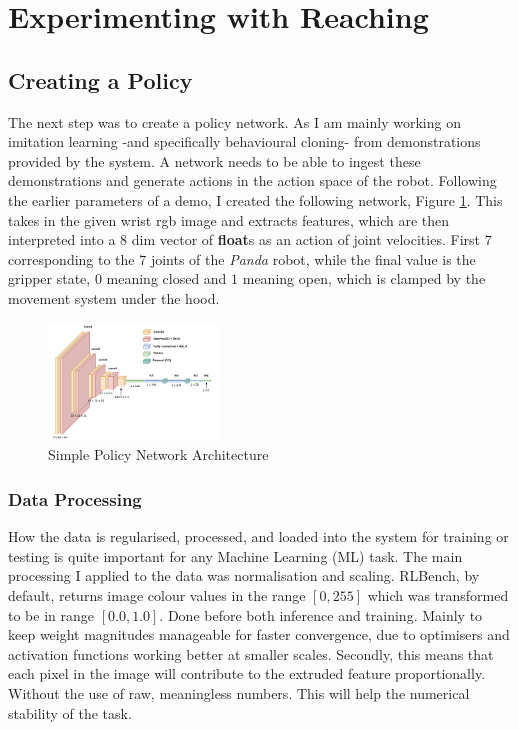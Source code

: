 \section{Experimenting with Reaching}\label{sec:reach-no-obs}

\subsection{Creating a Policy}
The next step was to create a policy network. As I am mainly working on imitation learning -and specifically behavioural cloning- from demonstrations provided by the system. A network needs to be able to ingest these demonstrations and generate actions in the action space of the robot. Following the earlier parameters of a demo, I created the following network, Figure \ref{fig:policy-arch}. This takes in the given wrist rgb image and extracts features, which are then interpreted into a $8$ dim vector of \textbf{float}s as an action of joint velocities. First $7$ corresponding to the $7$ joints of the \emph{Panda} robot, while the final value is the gripper state, $0$ meaning closed and $1$ meaning open, which is clamped by the movement system under the hood.

\begin{figure}[h]
  \centering
  \includegraphics[width=0.4\textwidth]{assets/early-work/cnn-encoder-policy-head.png}
  \caption{Simple Policy Network Architecture}\label{fig:policy-arch}
\end{figure}


\subsubsection{Data Processing}
How the data is regularised, processed, and loaded into the system for training or testing is quite important for any Machine Learning (ML) task. The main processing I applied to the data was normalisation and scaling. RLBench, by default, returns image colour values in the range \(\left[0, 255\right]\) which was transformed to be in range \(\left[0.0, 1.0\right]\). Done before both inference and training. Mainly to keep weight magnitudes manageable for faster convergence, due to optimisers and activation functions working better at smaller scales. Secondly, this means that each pixel in the image will contribute to the extruded feature proportionally. Without the use of raw, meaningless numbers. This will help the numerical stability of the task.

